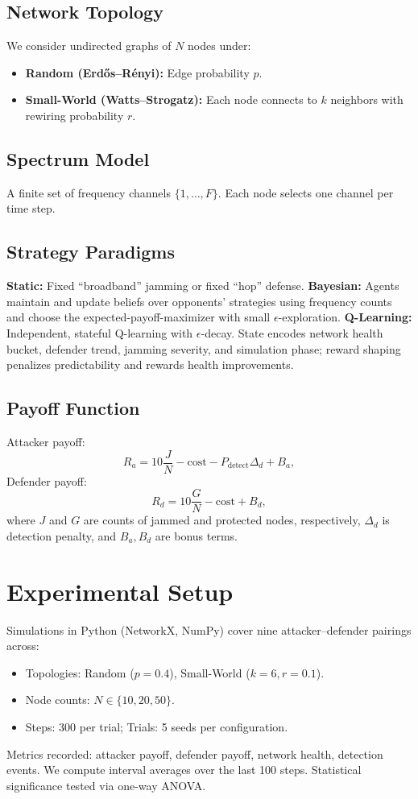 \documentclass[conference]{IEEEtran}
\begin{document}
\subsection{Network Topology}
We consider undirected graphs of \(N\) nodes under:
\begin{itemize}
  \item \textbf{Random (Erdős–Rényi):} Edge probability \(p\).
  \item \textbf{Small-World (Watts–Strogatz):} Each node connects to \(k\) neighbors with rewiring probability \(r\).
\end{itemize}

\subsection{Spectrum Model}
A finite set of frequency channels \(\{1,\dots,F\}\). Each node selects one channel per time step.

\subsection{Strategy Paradigms}
\textbf{Static:} Fixed “broadband” jamming or fixed “hop” defense.  
\textbf{Bayesian:} Agents maintain and update beliefs over opponents’ strategies using frequency counts and choose the expected-payoff-maximizer with small \(\epsilon\)-exploration.  
\textbf{Q-Learning:} Independent, stateful Q-learning with \(\epsilon\)-decay. State encodes network health bucket, defender trend, jamming severity, and simulation phase; reward shaping penalizes predictability and rewards health improvements.

\subsection{Payoff Function}
Attacker payoff:
\[
R_a = 10\frac{J}{N} - \text{cost} - P_{\mathrm{detect}}\Delta_d + B_a,
\]
Defender payoff:
\[
R_d = 10\frac{G}{N} - \text{cost} + B_d,
\]
where \(J\) and \(G\) are counts of jammed and protected nodes, respectively, \(\Delta_d\) is detection penalty, and \(B_a,B_d\) are bonus terms.

\section{Experimental Setup}
Simulations in Python (NetworkX, NumPy) cover nine attacker–defender pairings across:
\begin{itemize}
  \item Topologies: Random (\(p=0.4\)), Small-World (\(k=6,r=0.1\)).
  \item Node counts: \(N\in\{10,20,50\}\).
  \item Steps: 300 per trial; Trials: 5 seeds per configuration.
\end{itemize}
Metrics recorded: attacker payoff, defender payoff, network health, detection events. We compute interval averages over the last 100 steps. Statistical significance tested via one-way ANOVA.
\end{document}
